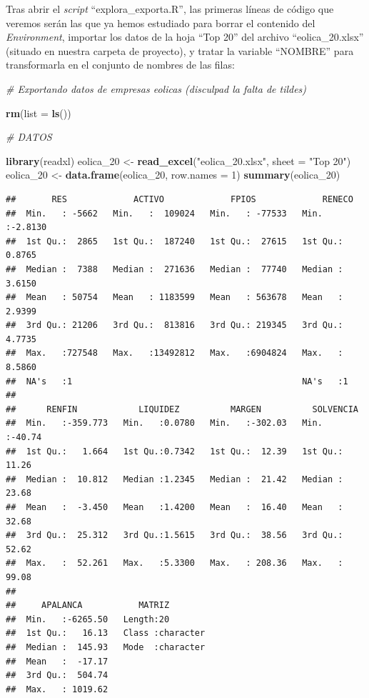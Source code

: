 \documentclass[
]{book}
\newenvironment{Shaded}{\begin{snugshade}}{\end{snugshade}}
\newcommand{\AttributeTok}[1]{\textcolor[rgb]{0.13,0.29,0.53}{#1}}
\newcommand{\CommentTok}[1]{\textcolor[rgb]{0.56,0.35,0.01}{\textit{#1}}}
\newcommand{\DecValTok}[1]{\textcolor[rgb]{0.00,0.00,0.81}{#1}}
\newcommand{\FunctionTok}[1]{\textcolor[rgb]{0.13,0.29,0.53}{\textbf{#1}}}
\newcommand{\NormalTok}[1]{#1}
\newcommand{\OtherTok}[1]{\textcolor[rgb]{0.56,0.35,0.01}{#1}}
\newcommand{\StringTok}[1]{\textcolor[rgb]{0.31,0.60,0.02}{#1}}
\begin{document}
Tras abrir el \emph{script} ``explora\_exporta.R'', las primeras líneas de código que veremos serán las que ya hemos estudiado para borrar el contenido del \emph{Environment}, importar los datos de la hoja ``Top 20'' del archivo ``eolica\_20.xlsx'' (situado en nuestra carpeta de proyecto), y tratar la variable ``NOMBRE'' para transformarla en el conjunto de nombres de las filas:

\begin{Shaded}
\begin{Highlighting}[]
\CommentTok{\# Exportando datos de empresas eolicas (disculpad la falta de tildes)}

\FunctionTok{rm}\NormalTok{(}\AttributeTok{list =} \FunctionTok{ls}\NormalTok{())}

\CommentTok{\# DATOS}

\FunctionTok{library}\NormalTok{(readxl)}
\NormalTok{eolica\_20 }\OtherTok{\textless{}{-}} \FunctionTok{read\_excel}\NormalTok{(}\StringTok{"eolica\_20.xlsx"}\NormalTok{, }\AttributeTok{sheet =} \StringTok{"Top 20"}\NormalTok{)}
\NormalTok{eolica\_20 }\OtherTok{\textless{}{-}} \FunctionTok{data.frame}\NormalTok{(eolica\_20, }\AttributeTok{row.names =} \DecValTok{1}\NormalTok{)}
\FunctionTok{summary}\NormalTok{(eolica\_20)}
\end{Highlighting}
\end{Shaded}

\begin{verbatim}
##       RES             ACTIVO             FPIOS             RENECO       
##  Min.   : -5662   Min.   :  109024   Min.   : -77533   Min.   :-2.8130  
##  1st Qu.:  2865   1st Qu.:  187240   1st Qu.:  27615   1st Qu.: 0.8765  
##  Median :  7388   Median :  271636   Median :  77740   Median : 3.6150  
##  Mean   : 50754   Mean   : 1183599   Mean   : 563678   Mean   : 2.9399  
##  3rd Qu.: 21206   3rd Qu.:  813816   3rd Qu.: 219345   3rd Qu.: 4.7735  
##  Max.   :727548   Max.   :13492812   Max.   :6904824   Max.   : 8.5860  
##  NA's   :1                                             NA's   :1        
## 
##      RENFIN            LIQUIDEZ          MARGEN          SOLVENCIA     
##  Min.   :-359.773   Min.   :0.0780   Min.   :-302.03   Min.   :-40.74  
##  1st Qu.:   1.664   1st Qu.:0.7342   1st Qu.:  12.39   1st Qu.: 11.26  
##  Median :  10.812   Median :1.2345   Median :  21.42   Median : 23.68  
##  Mean   :  -3.450   Mean   :1.4200   Mean   :  16.40   Mean   : 32.68  
##  3rd Qu.:  25.312   3rd Qu.:1.5615   3rd Qu.:  38.56   3rd Qu.: 52.62  
##  Max.   :  52.261   Max.   :5.3300   Max.   : 208.36   Max.   : 99.08  
## 
##     APALANCA           MATRIZ         
##  Min.   :-6265.50   Length:20         
##  1st Qu.:   16.13   Class :character  
##  Median :  145.93   Mode  :character  
##  Mean   :  -17.17                     
##  3rd Qu.:  504.74                     
##  Max.   : 1019.62
\end{verbatim}
\end{document}
